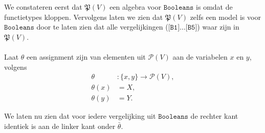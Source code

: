 \documentclass[a4paper,11pt]{article}
\begin{document}
We constateren eerst dat $\mathfrak{P}(V)$ een algebra voor
$\texttt{Booleans}$ is omdat de functietypes kloppen. Vervolgens laten we zien
dat $\mathfrak{P}(V)$ zelfs een model is voor $\texttt{Booleans}$ door te
laten zien dat alle vergelijkingen ($\texttt{[B1]} \ldots \texttt{[B5]}$) waar
zijn in $\mathfrak{P}(V)$.

\paragraph{}

Laat $\theta$ een assignment zijn van elementen uit $\mathcal{P}(V)$ aan
de variabelen $x$ en $y$, volgens
\begin{align*}
\theta    &: \{x,y\} \rightarrow \mathcal{P}(V), \\
\theta(x) &= X, \\
\theta(y) &= Y.
\end{align*}

We laten nu zien dat voor iedere vergelijking uit $\texttt{Booleans}$ de
rechter kant identiek is aan de linker kant onder $\bar \theta$.
\end{document}
